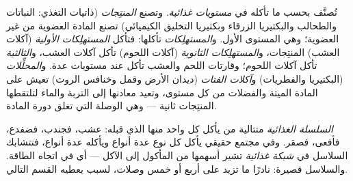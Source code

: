 \begin{definition}\label{def:b1:ecosystem-organization:trophic}
تُصنَّف   بحسب ما تأكله في \emph{مستويات
غذائية}. وتصنع \emph{المنتِجات} (ذاتيات التغذي: النباتات والطحالب
والبكتيريا الزرقاء وبكتيريا التخليق الكيميائي) تصنع المادة العضوية
من غير العضوية؛ وهي المستوى الأول. و\emph{المستهلِكات} تأكلها:
فتأكل \emph{المستهلِكات الأولية} (آكلات العشب) المنتِجات،
و\emph{المستهلِكات الثانوية} (آكلات اللحوم) تأكل آكلات العشب،
و\emph{الثالثية} تأكل آكلات اللحوم؛ وقارتات اللحم والعشب تأكل عند
مستويات عدة. و\emph{المحلِّلات} (البكتيريا والفطريات)
و\emph{آكلات الفتات} (ديدان الأرض وقمل  وخنافس الروث) تعيش على
المادة الميتة والفضلات من كل مستوى، وتعيد معادنها إلى التربة والماء
لتلتقطها المنتِجات ثانية --- وهي الوصلة التي تغلق دورة المادة.
\end{definition}

\begin{definition}\label{def:b1:ecosystem-organization:foodweb}
\emph{السلسلة الغذائية} متتالية من  يأكل كل واحد منها الذي
قبله: عشب، فجندب، فضفدع، فأفعى، فصقر. وفي مجتمع حقيقي يأكل كل نوع
عدة أنواع ويأكله عدة أنواع، فتتشابك السلاسل في \emph{شبكة غذائية}
تشير أسهمها من المأكول إلى الآكل --- أي في اتجاه الطاقة. والسلاسل
قصيرة: نادرًا ما تزيد على أربع أو خمس وصلات، لسبب يعطيه القسم
التالي.
\end{definition}

